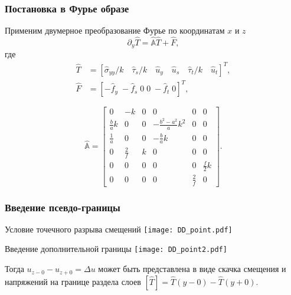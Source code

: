 \begin{frame}
    \frametitle{Постановка в Фурье образе}
    Применим двумерное преобразование Фурье по координатам $x$ и $z$
    \begin{equation}
        \label{eq:FT_system}
        \partial_y \hat{T} = \hat{\mathbb{A}} \hat{T} + \hat{F},
    \end{equation}
    где
    \begin{equation}
        \label{eq:FourierT}
        \begin{split}
            \hat{T} &= \left[\hat{\sigma}_{yy}/k \quad \hat{\tau}_s/k \quad \hat{u}_y \quad \hat{u}_s \quad  \hat{\tau}_t/k \quad  \hat{u}_t \right]^T, \\
            \hat{F} &= \left[-\hat{f}_y \; -\hat{f}_s \; 0 \; 0 \; -\hat{f}_t \; 0\right]^T,
        \end{split}
    \end{equation}

    \begin{equation}
        \label{eq:FourierA}
        \hat{\mathbb{A}} = 
        \left[\begin{array}{cccccc}
            0 & -k & 0 & 0 & 0 & 0 \\
            \frac{b}{a}k & 0 & 0 & -\frac{b^2-a^2}{a}k^2 & 0 & 0 \\
            \frac{1}{a} & 0 & 0 & -\frac{b}{a}k & 0 & 0 \\
            0 & \frac{2}{f} & k & 0 & 0 & 0 \\
            0 & 0 & 0 & 0 & 0 & \frac{f}{2}k \\
            0 & 0 & 0 & 0 & \frac{2}{f} & 0 
        \end{array}\right].
    \end{equation}
\end{frame}

\begin{frame}
    \frametitle{Введение псевдо-границы}
    \begin{minipage}[t]{0.47\linewidth}
        \footnotesize{Условие точечного разрыва смещений}
        \texttt{[image: DD\_point.pdf]}
    \end{minipage}
    \hfill
    \begin{minipage}[t]{0.47\linewidth}
        \footnotesize{Введение дополнительной границы}
        \texttt{[image: DD\_point2.pdf]}
    \end{minipage}
    Тогда $u_{z-0} - u_{z+0} = \Delta u$ может быть представлена в виде скачка смещения и напряжений на границе раздела слоев $\left[ \hat{T} \right] = \hat{T}(y-0) - \hat{T}(y+0)$.
\end{frame}

